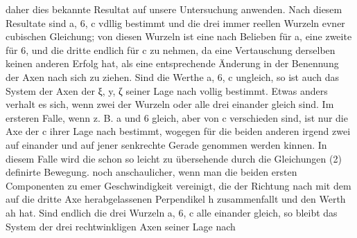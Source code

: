\documentclass[11pt]{article}
\begin{document}
daher dies bekannte Resultat auf unsere Untersuchung anwenden. Nach diesem Resultate sind a, 6, c vdllig bestimmt und die drei immer reellen Wurzeln evner cubischen
Gleichung; von diesen Wurzeln ist eine nach Belieben für a, eine zweite für 6, und die
dritte endlich für c zu nehmen, da eine Vertauschung derselben keinen anderen Erfolg
hat, als eine entsprechende Änderung in der Benennung der Axen nach sich zu ziehen.
Sind die Werthe a, 6, c ungleich, so ist auch das System der Axen der ξ, y, ζ seiner Lage
nach vollig bestimmt. Etwas anders verhalt es sich, wenn zwei der Wurzeln oder alle drei
einander gleich sind. Im ersteren Falle, wenn z. B. a und 6 gleich, aber von c verschieden
sind, ist nur die Axe der c ihrer Lage nach bestimmt, wogegen für die beiden anderen
irgend zwei auf einander und auf jener senkrechte Gerade genommen werden kinnen. In
diesem Falle wird die schon so leicht zu übersehende durch die Gleichungen (2) definirte
Bewegung. noch anschaulicher, wenn man die beiden ersten Componenten zu emer Geschwindigkeit vereinigt, die der Richtung nach mit dem auf die dritte Axe herabgelassenen
Perpendikel h zusammenfallt und den Werth ah hat. Sind endlich die drei Wurzeln a, 6, c
alle einander gleich, so bleibt das System der drei rechtwinkligen Axen seiner Lage nach
\end{document}
